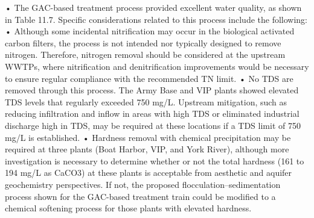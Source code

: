 \documentclass{article}
\begin{document}
• The GAC-based treatment process provided excellent water quality, as
shown in Table 11.7. Specific considerations related to this process
include the following: • Although some incidental nitrification may
occur in the biological activated carbon filters, the process is not
intended nor typically designed to remove nitrogen. Therefore, nitrogen
removal should be considered at the upstream WWTPs, where nitrification
and denitrification improvements would be necessary to ensure regular
compliance with the recommended TN limit. • No TDS are removed through
this process. The Army Base and VIP plants showed elevated TDS levels
that regularly exceeded 750 mg/L. Upstream mitigation, such as reducing
infiltration and inflow in areas with high TDS or eliminated industrial
discharge high in TDS, may be required at these locations if a TDS limit
of 750 mg/L is established. • Hardness removal with chemical
precipitation may be required at three plants (Boat Harbor, VIP, and
York River), although more investigation is necessary to determine
whether or not the total hardness (161 to 194 mg/L as CaCO3) at these
plants is acceptable from aesthetic and aquifer geochemistry
perspectives. If not, the proposed flocculation--sedimentation process
shown for the GAC-based treatment train could be modified to a chemical
softening process for those plants with elevated hardness.
\end{document}
